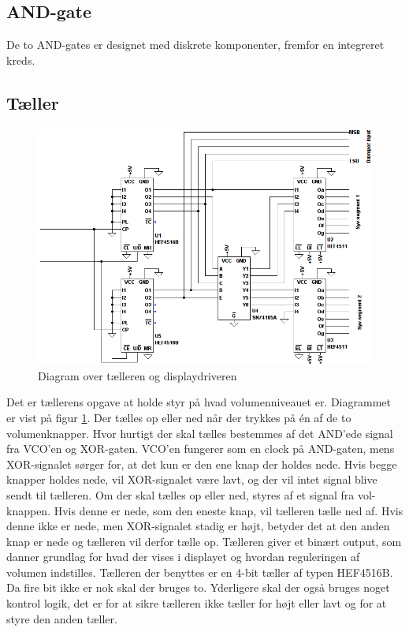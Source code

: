 \subsection*{AND-gate}
\label{volumenkontrol-design-and}

De to AND-gates er designet med diskrete komponenter, fremfor en integreret kreds.

\subsection*{Tæller}
\label{volumenkontrol-design-taeller}

\begin{figure}[h]
\centering
\includegraphics[width=\textwidth]{teknisk/volumenkontrol/taeller.png}
\caption{Diagram over tælleren og displaydriveren}
\label{fig:taeller}
\end{figure}

Det er tællerens opgave at holde styr på hvad volumenniveauet er. Diagrammet er vist på figur \ref{fig:taeller}. Der tælles op eller ned når der trykkes på én af de to volumenknapper. Hvor hurtigt der skal tælles bestemmes af det AND'ede signal fra VCO'en og XOR-gaten. VCO'en fungerer som en clock på AND-gaten, mens XOR-signalet sørger for, at det kun er den ene knap der holdes nede. Hvis begge knapper holdes nede, vil XOR-signalet være lavt, og der vil intet signal blive sendt til tælleren. Om der skal tælles op eller ned, styres af et signal fra vol- knappen. Hvis denne er nede, som den eneste knap, vil tælleren tælle ned af. Hvis denne ikke er nede, men XOR-signalet stadig er højt, betyder det at den anden knap er nede og tælleren vil derfor tælle op. Tælleren giver et binært output, som danner grundlag for hvad der vises i displayet og hvordan reguleringen af volumen indstilles. Tælleren der benyttes er en 4-bit tæller af typen HEF4516B. Da fire bit ikke er nok skal der bruges to. Yderligere skal der også bruges noget kontrol logik, det er for at sikre tælleren ikke tæller for højt eller lavt og for at styre den anden tæller.

